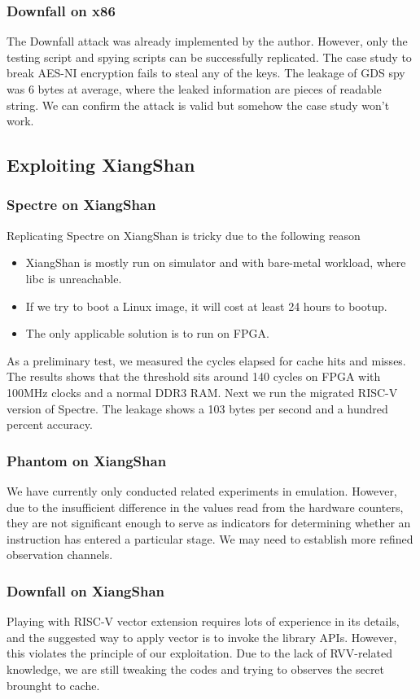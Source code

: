 \subsubsection{Downfall on x86}
The Downfall attack was already implemented by the author. However, only the testing script and spying scripts can be successfully replicated.
The case study to break AES-NI encryption fails to steal any of the keys. The leakage of GDS spy was 6 bytes at average, where the leaked information
are pieces of readable string. We can confirm the attack is valid but somehow the case study won't work.

\subsection{Exploiting XiangShan}

\subsubsection{Spectre on XiangShan}
Replicating Spectre on XiangShan is tricky due to the following reason
\begin{itemize}
    \item XiangShan is mostly run on simulator and with bare-metal workload, where libc is unreachable.
    \item If we try to boot a Linux image, it will cost at least 24 hours to bootup.
    \item The only applicable solution is to run on FPGA.
\end{itemize}
As a preliminary test, we measured the cycles elapsed for cache hits and misses. The results shows that the threshold sits around 140 cycles on FPGA with 100MHz clocks and a normal DDR3 RAM. Next we run the migrated RISC-V version of Spectre. The leakage shows a 103 bytes per second and a hundred percent accuracy. 

\subsubsection{Phantom on XiangShan}
We have currently only conducted related experiments in emulation. However, due to the insufficient difference in the values read from the hardware counters, they are not significant enough to serve as indicators for determining whether an instruction has entered a particular stage. We may need to establish more refined observation channels.

\subsubsection{Downfall on XiangShan}
Playing with RISC-V vector extension requires lots of experience in its details, and the suggested way to apply vector is to invoke the library
APIs. However, this violates the principle of our exploitation. Due to the lack of RVV-related knowledge, we are still tweaking the codes and trying
to observes the secret brounght to cache.